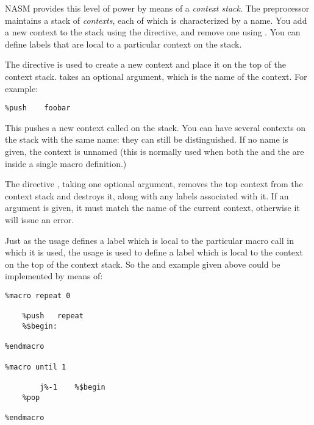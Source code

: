 NASM provides this level of power by means of a \emph{context stack}.
The preprocessor maintains a stack of \emph{contexts}, each of which is
characterized by a name. You add a new context to the stack using
the  directive, and remove one using .
You can define labels that are local to a particular context on the stack.


The  directive is used to create a new context and place it
on the top of the context stack.  takes an optional argument,
which is the name of the context. For example:

\begin{lstlisting}
%push    foobar
\end{lstlisting}

This pushes a new context called  on the stack. You can have
several contexts on the stack with the same name: they can still be
distinguished.  If no name is given, the context is unnamed (this is
normally used when both the  and the  are inside a
single macro definition.)

The directive , taking one optional argument, removes the top
context from the context stack and destroys it, along with any
labels associated with it.  If an argument is given, it must match the
name of the current context, otherwise it will issue an error.


Just as the usage  defines a label which is local to the
particular macro call in which it is used, the usage \indexcode{\%\$}
is used to define a label which is local to the context on the top
of the context stack. So the  and  example given
above could be implemented by means of:

\begin{lstlisting}
%macro repeat 0

    %push   repeat
    %$begin:

%endmacro

%macro until 1

        j%-1    %$begin
    %pop

%endmacro
\end{lstlisting}


